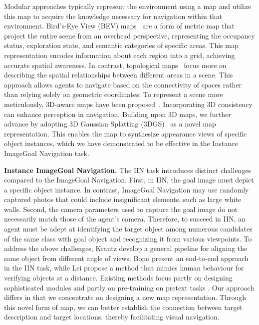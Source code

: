Modular approaches typically represent the environment using a map and utilize this map to acquire the knowledge necessary for navigation within that environment. Bird's-Eye View (BEV) maps~\cite{liu2023bird, chaplot2020object, krantz2023navigating, lei2024instanceaware} are a form of metric map that project the entire scene from an overhead perspective, representing the occupancy status, exploration state, and semantic categories of specific areas. This map representation encodes information about each region into a grid, achieving accurate spatial awareness. In contrast, topological maps~\cite{Chaplot_2020_CVPR, TSGM, Kwon_2023_CVPR} focus more on describing the spatial relationships between different areas in a scene. This approach allows agents to navigate based on the connectivity of spaces rather than relying solely on geometric coordinates. To represent a scene more meticulously, 3D-aware maps have been proposed~\cite{chaplot2021seal, zhang20233d, tan2024self, liu2024volumetric}. Incorporating 3D consistency can enhance perception in navigation. Building upon 3D maps, we further advance by adopting 3D Gaussian Splatting (3DGS)~\cite{kerbl3Dgaussians} as a novel map representation. This enables the map to synthesize appearance views of specific object instances, which we have demonstrated to be effective in the Instance ImageGoal Navigation task.


\textbf{Instance ImageGoal Navigation.} The IIN task introduces distinct challenges compared to the ImageGoal Navigation. First, in IIN, the goal image must depict a specific object instance. In contrast, ImageGoal Navigation may use randomly captured photos that could include insignificant elements, such as large white walls. Second, the camera parameters used to capture the goal image do not necessarily match those of the agent's camera. Therefore, to succeed in IIN, an agent must be adept at identifying the target object among numerous candidates of the same class with goal object and recognizing it from various viewpoints. To address the above challenges, Krantz \etal \cite{krantz2023navigating} develop a general pipeline for aligning the same object from different angle of views. Bono \etal \cite{bono2023endtoend} present an end-to-end approach in the IIN task, while Lei \etal \cite{lei2024instanceaware} propose a method that mimics human behaviour for verifying objects at a distance. Existing methods focus partly on designing sophisticated modules \cite{krantz2023navigating, lei2024instanceaware} and partly on pre-training on pretext tasks \cite{bono2023endtoend}. Our approach differs in that we concentrate on designing a new map representation. Through this novel form of map, we can better establish the connection between target description and target locations, thereby facilitating visual navigation.


